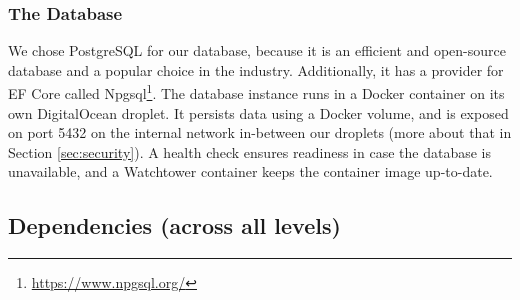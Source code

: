 \documentclass[12pt,a4paper,reqno]{report}
\begin{document}


\subsubsection{The Database}
We chose PostgreSQL for our database, because it is an efficient and open-source database and a popular choice in the industry. Additionally, it has a provider for EF Core called Npgsql\footnote{\url{https://www.npgsql.org/}}. The database instance runs in a Docker container on its own DigitalOcean droplet. It persists data using a Docker volume, and is exposed on port 5432 on the internal network in-between our droplets (more about that in Section \ref{sec:security}). A health check ensures readiness in case the database is unavailable, and a Watchtower container keeps the container image up-to-date.

\subsection{Dependencies (across all levels)}
\end{document}
